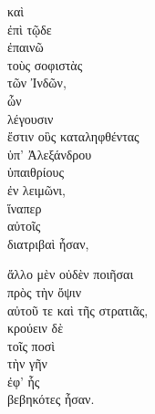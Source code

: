 
{\large
\begin{greek}
\noindent  καὶ \\
\tabto{2em} ἐπὶ τῷδε \\
ἐπαινῶ \\
τοὺς σοφιστὰς \\
\tabto{2em} τῶν Ἰνδῶν, \\
\tabto{4em} ὧν \\
\tabto{4em} λέγουσιν \\
\tabto{6em} ἔστιν οὓς καταληφθέντας \\
\tabto{8em} ὑπ' Ἀλεξάνδρου \\
\tabto{6em} ὑπαιθρίους \\
\tabto{8em} ἐν λειμῶνι, \\
\tabto{6em} ἵναπερ \\
\tabto{8em} αὐτοῖς \\
\tabto{6em} διατριβαὶ ἦσαν,

\tabto{6em} ἄλλο μὲν οὐδὲν ποιῆσαι \\
\tabto{8em} πρὸς τὴν ὄψιν \\
\tabto{10em} αὐτοῦ τε καὶ τῆς στρατιᾶς, \\
\tabto{6em} κρούειν δὲ \\
\tabto{8em} τοῖς ποσὶ \\
\tabto{6em} τὴν γῆν \\
\tabto{8em} ἐφ' ἧς \\
\tabto{10em} βεβηκότες ἦσαν.\\

\end{greek}
}


